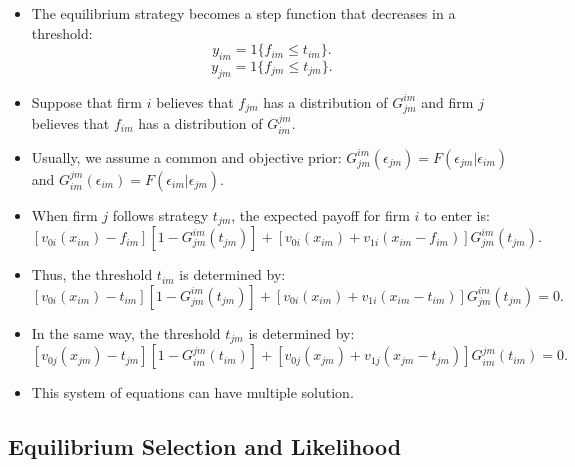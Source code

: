 \documentclass[
]{book}
\providecommand{\tightlist}{%
  \setlength{\itemsep}{0pt}\setlength{\parskip}{0pt}}
\begin{document}
\begin{itemize}
\tightlist
\item
  The equilibrium strategy becomes a step function that decreases in a threshold:
  \[
  y_{im} = 1\{f_{im} \le t_{im}\}.
  \]
  \[
  y_{jm} = 1\{f_{jm} \le t_{jm}\}.
  \]
\item
  Suppose that firm \(i\) believes that \(f_{jm}\) has a distribution of \(G_{jm}^{im}\) and firm \(j\) believes that \(f_{im}\) has a distribution of \(G_{im}^{jm}\).
\item
  Usually, we assume a common and objective prior: \(G_{jm}^{im}(\epsilon_{jm}) = F(\epsilon_{jm}|\epsilon_{im})\) and \(G_{im}^{jm}(\epsilon_{im}) = F(\epsilon_{im}|\epsilon_{jm})\).
\item
  When firm \(j\) follows strategy \(t_{jm}\), the expected payoff for firm \(i\) to enter is:
  \[
  [v_{0i}(x_{im}) - f_{im}][1 - G_{jm}^{im}(t_{jm})] + [v_{0i}(x_{im}) + v_{1i}(x_{im} - f_{im})] G_{jm}^{im}(t_{jm}).
  \]
\item
  Thus, the threshold \(t_{im}\) is determined by:
  \[
  [v_{0i}(x_{im}) - t_{im}][1 - G_{jm}^{im}(t_{jm})] + [v_{0i}(x_{im}) + v_{1i}(x_{im} - t_{im})] G_{jm}^{im}(t_{jm}) = 0.
  \]
\item
  In the same way, the threshold \(t_{jm}\) is determined by:
  \[
  [v_{0j}(x_{jm}) - t_{jm}][1 - G_{im}^{jm}(t_{im})] + [v_{0j}(x_{jm}) + v_{1j}(x_{jm} - t_{jm})] G_{im}^{jm}(t_{im}) = 0.
  \]
\item
  This system of equations can have multiple solution.
\end{itemize}

\hypertarget{equilibrium-selection-and-likelihood}{%
\subsection{Equilibrium Selection and Likelihood}\label{equilibrium-selection-and-likelihood}}
\end{document}
